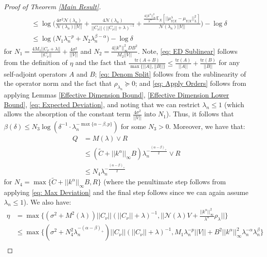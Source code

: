 \documentclass[accepted]{article}
\theoremstyle{definition}
\begin{document}
\begin{proof}[Proof of Theorem \ref{Main Result}]
\begin{align}
    & \leq \log \Big(\frac{4\sigma^2 \mathcal{N}(\lambda_n)}{\mathcal{N}(\lambda_n)||V||} + \frac{4\mathcal{N}(\lambda_n)}{||C_{\nu}||(||C_{\nu}|| + \lambda)^{-1}} + \frac{\frac{4||k^{\alpha}||^2_{\infty}}{\lambda^{\alpha}}\mathbb{E}_X[||\mu^{\lambda}_{Y|X} - \mu_{Y|X}||_L^2]}{\mathcal{N}(\lambda_n)||V||}\Big) - \log \delta \label{eq: Denom Split} \\
    & \leq \log \Big(N_1\lambda^{-p}_n + N_2\lambda^{\beta - \alpha}_n\Big) - \log \delta \label{eq: Apply Orders}
\end{align}
for $N_1 = \frac{4M_1||C_{\nu} + \lambda||}{||C_{\nu}||} + \frac{4\sigma^2}{||V||}$ and $N_2 = \frac{4||k^{\alpha}||^2_{\infty}DB^2}{M_2 ||V||}$. Note, \eqref{eq: ED Sublinear} follows from the definition of $\eta$ and the fact that $\frac{\text{tr}(A + B)}{\max\{||A||, ||B||\}} \leq \frac{\text{tr}(A)}{||A||} + \frac{\text{tr}(B)}{||B||}$ for any self-adjoint operators $A$ and $B$; \eqref{eq: Denom Split} follows from the sublinearity of the operator norm and the fact that $\rho_{\lambda_n} \succcurlyeq	0$; and \eqref{eq: Apply Orders} follows from applying Lemmas \ref{Effective Dimension Bound}, \ref{Effective Dimension Lower Bound}, \eqref{eq: Expected Deviation}, and noting that we can restrict $\lambda_n \leq 1$ (which allows the absorption of the constant term $\frac{4\sigma^2 }{||V||}$ into $N_1$). Thus, it follows that $\beta(\delta) \leq N_3\log (\delta^{-1} \cdot \lambda_n^{-\max\{\alpha - \beta, p\}})$ for some $N_3 > 0$. Moreover, we have that:
\begin{align}
    Q & = M(\lambda) \vee R \nonumber \\
    & \leq (\tilde{C} + ||k^{\alpha}||_{\infty}B)\lambda_n^{-\frac{(\alpha - \beta)_{+}}{2}} \vee R \nonumber \\
    & \leq N_4\lambda_n^{-\frac{(\alpha - \beta)_{+}}{2}} \label{eq: Estimate for Q}
\end{align}
for $N_4 = \max\{\tilde{C} + ||k^{\alpha}||_{\infty}B, R\}$ (where the penultimate step follows from applying \eqref{eq: Max Deviation} and the final step follows since we can again assume $\lambda_n \leq 1$). We also have:
\begin{align}
    \eta & = \max\{(\sigma^2 + M^2(\lambda))||C_{\nu}||(||C_{\nu}|| + \lambda)^{-1}, ||\mathcal{N}(\lambda)V + \frac{||k^{\alpha}||^2_{\infty}}{\lambda^{\alpha}}\rho_{\lambda}||\}\nonumber \\
    & \leq \max\{(\sigma^2 + N^2_4 \lambda^{-(\alpha - \beta)_{+}}_n)||C_{\nu}||(||C_{\nu}|| + \lambda)^{-1}, M_1\lambda_n^{-p}||V|| + B^2||k^{\alpha}||^2_{\infty}\lambda^{-\alpha}_n \lambda^{\beta}_n\}  \label{eq: Using Orders} \\

\end{align}
\end{proof}
\end{document}
